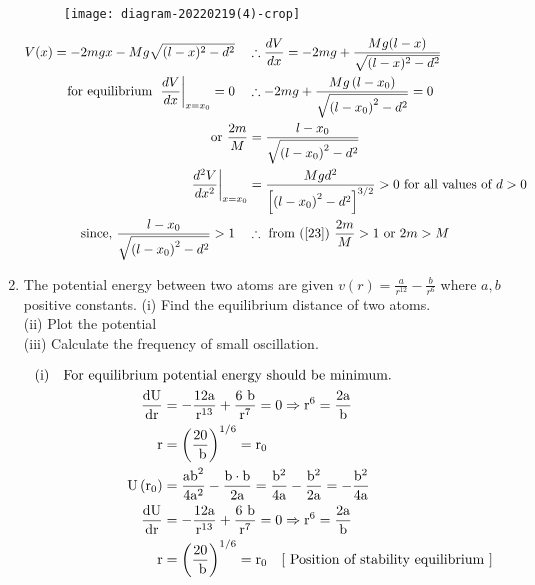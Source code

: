 \begin{enumerate}
\begin{answer}
		\begin{figure}[H]
			\centering
			\texttt{[image: diagram-20220219(4)-crop]}
		\end{figure}
		\begin{align}
		V(x)=-2 m g x-M g \sqrt{(l-x)^{2}-d^{2}} \quad &\therefore \frac{d V}{d x}=-2 m g+\frac{M g(l-x)}{\sqrt{(l-x)^{2}-d^{2}}}\notag\\
		\text{for equilibrium }\left.\frac{d V}{d x}\right|_{x=x_{0}}=0 \quad &\therefore-2 m g+\frac{M g\left(l-x_{0}\right)}{\sqrt{\left(l-x_{0}\right)^{2}-d^{2}}}=0\notag\\
	\text{	or }\frac{2 m}{M}&=\frac{l-x_{0}}{\sqrt{\left(l-x_{0}\right)^{2}-d^{2}}}\label{23}\\
	\left.\frac{d^{2} V}{d x^{2}}\right|_{x=x_{0}}&=\frac{M g d^{2}}{\left[\left(l-x_{0}\right)^{2}-d^{2}\right]^{3 / 2}}>0\text{ for all values of $d>0$}\notag\\
	\text{since, }\frac{l-x_{0}}{\sqrt{\left(l-x_{0}\right)^{2}-d^{2}}}>1 \quad &\therefore\text{ from (\ref{23}) }\frac{2 m}{M}>1\text{ or }2 m>M\notag
		\end{align}
	\end{answer}
\item The potential energy between two atoms are given $v(r)=\frac{a}{r^{12}}-\frac{b}{r^{6}}$ where $a, b$ positive constants.
(i) Find the equilibrium distance of two atoms.\\
(ii) Plot the potential\\
(iii) Calculate the frequency of small oscillation.\\
	\begin{answer}
		\begin{align*}
		\text{(i)\quad For equilibrium }&\text{potential energy should be minimum.}\\
		\frac{\mathrm{dU}}{\mathrm{dr}}&=-\frac{12 \mathrm{a}}{\mathrm{r}^{13}}+\frac{6 \mathrm{~b}}{\mathrm{r}^{7}}=0 \Rightarrow \mathrm{r}^{6}=\frac{2 \mathrm{a}}{\mathrm{b}} \\
		\mathrm{r}&=\left(\frac{20}{\mathrm{~b}}\right)^{1 / 6}=\mathrm{r}_{0} \\
		\mathrm{U}\left(\mathrm{r}_{0}\right)&=\frac{\mathrm{ab}^{2}}{4 \mathrm{a}^{2}}-\frac{\mathrm{b} \cdot \mathrm{b}}{2 \mathrm{a}}=\frac{\mathrm{b}^{2}}{4 \mathrm{a}}-\frac{\mathrm{b}^{2}}{2 \mathrm{a}}=-\frac{\mathrm{b}^{2}}{4 \mathrm{a}}\\
		\frac{\mathrm{dU}}{\mathrm{dr}}&=-\frac{12 \mathrm{a}}{\mathrm{r}^{13}}+\frac{6 \mathrm{~b}}{\mathrm{r}^{7}}=0 \Rightarrow \mathrm{r}^{6}=\frac{2 \mathrm{a}}{\mathrm{b}}\\ \mathrm{r}&=\left(\frac{20}{\mathrm{~b}}\right)^{1 / 6}=\mathrm{r}_{0} \quad[\text{ Position of stability equilibrium }]\\

\end{align*}
\end{answer}
\end{enumerate}
